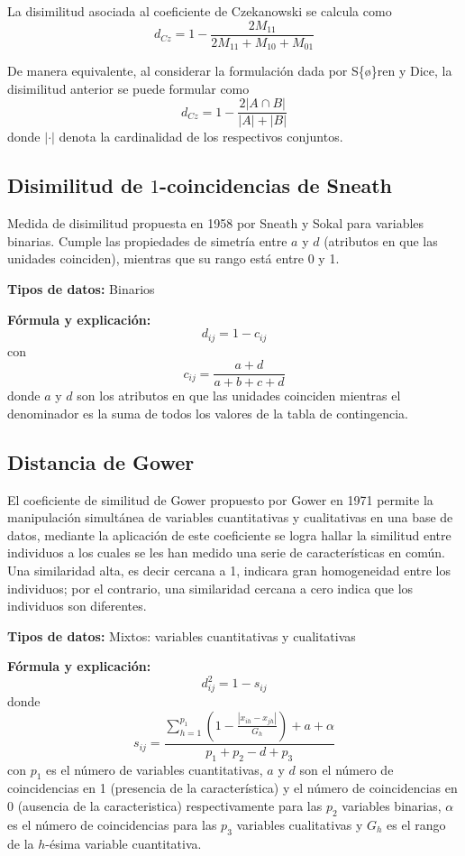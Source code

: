 \documentclass[
]{book}
\begin{document}
La disimilitud asociada al coeficiente de Czekanowski se calcula como
\[
      d_{Cz} = 1 - \frac{2M_{11}}{2M_{11} + M_{10} + M_{01}}
   \]

De manera equivalente, al considerar la formulación dada por S\{\o\}ren y Dice, la disimilitud anterior se puede formular como
\[
      d_{Cz} = 1 - \frac{2 |A\cap B|}{|A| + |B|}
   \]
donde \(|\cdot|\) denota la cardinalidad de los respectivos conjuntos.

\subsection{\texorpdfstring{Disimilitud de \(1\)-coincidencias de Sneath}{Disimilitud de 1-coincidencias de Sneath}}\label{disimilitud-de-1-coincidencias-de-sneath}

Medida de disimilitud propuesta en 1958 por Sneath y Sokal para variables binarias. Cumple las propiedades de simetría entre \(a\) y \(d\) (atributos en que las unidades coinciden), mientras que su rango está entre 0 y 1.

\textbf{Tipos de datos:} Binarios

\textbf{Fórmula y explicación:} \[
    d_{ij} = 1 - c_{ij}
   \]
con
\[
      c_{ij} = \frac{a+d}{a+b+c+d}
   \]
donde \(a\) y \(d\) son los atributos en que las unidades coinciden mientras el denominador es la suma de todos los valores de la tabla de contingencia.

\subsection{Distancia de Gower}\label{distancia-de-gower}

El coeficiente de similitud de Gower propuesto por Gower en 1971 permite la manipulación simultánea de variables cuantitativas y cualitativas en una base de datos, mediante la aplicación de este coeficiente se logra hallar la similitud entre individuos a los cuales se les han medido una serie de características en común. Una similaridad alta, es decir cercana a 1, indicara gran homogeneidad entre los individuos; por el contrario, una similaridad cercana a cero indica que los individuos son diferentes.

\textbf{Tipos de datos:} Mixtos: variables cuantitativas y cualitativas

\textbf{Fórmula y explicación:}\\
\[
      d_{ij}^{2} = 1-s_{ij}
   \]
donde
\[
      s_{i j} = \frac{\sum\limits_{h=1}^{p_1}\left(1-\frac{\left|x_{ih}-x_{jh}\right|}{G_h}\right) + a + \alpha}{p_{1}+p_{2}-d+p_{3}}
    \]
con \(p_1\) es el número de variables cuantitativas, \(a\) y \(d\) son el número de coincidencias en 1 (presencia de la característica) y el número de coincidencias en 0 (ausencia de la caracteristica) respectivamente para las \(p_2\) variables binarias, \(\alpha\) es el número de coincidencias para las \(p_3\) variables cualitativas y \(G_h\) es el rango de la \(h\)-ésima variable cuantitativa.
\end{document}
